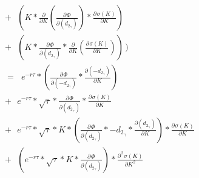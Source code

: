 \documentclass[12pt]{article}
\begin{document}
{\begin{align*}
\\
&+ \hspace{8pt}   (K * \frac{\partial}{\partial K}(\frac{\partial \hspace{1pt} \Phi}{\partial (d_{2_{\hspace{1pt} \gamma}})}) * \frac{\partial \hspace{1pt} \sigma(K)}{\partial K})
\\[12pt]
&+ \hspace{8pt}   (K * \frac{\partial \hspace{1pt} \Phi}{\partial (d_{2_{\hspace{1pt} \gamma}})} * \frac{\partial}{\partial K}(\frac{\partial \hspace{1pt} \sigma(K)}{\partial K}))\hspace{2pt})
\\[35pt]
\hspace{3pt} &= \hspace{7pt}   e^{-r \tau} * (\frac{\partial \hspace{1pt} \Phi}{\partial (-d_{2_{\hspace{1pt} \gamma}})} * \frac{\partial (-d_{2_{\hspace{1pt} \gamma}})}{\partial K})
\\[12pt]
&+ \hspace{8pt}   e^{-r \tau} * \sqrt{\tau} * \frac{\partial \hspace{1pt} \Phi}{\partial (d_{2_{\hspace{1pt} \gamma}})} * \frac{\partial \hspace{1pt} \sigma(K)}{\partial K}
\\[12pt]
&+ \hspace{8pt}   e^{-r \tau} * \sqrt{\tau} * K * (\frac{\partial \hspace{1pt} \Phi}{\partial (d_{2_{\hspace{1pt} \gamma}})} * -d_{2_{\hspace{1pt} \gamma}} * \frac{\partial (d_{2_{\hspace{1pt} \gamma}})}{\partial K}) * \frac{\partial \hspace{1pt} \sigma(K)}{\partial K}
\\[12pt]
&+ \hspace{8pt}   (e^{-r \tau} * \sqrt{\tau} * K * \frac{\partial \hspace{1pt} \Phi}{\partial (d_{2_{\hspace{1pt} \gamma}})}) * \frac{\partial^{\hspace{1pt} 2} \hspace{1pt} \sigma(K)}{\partial K^{\hspace{1pt} 2}}

\end{align*}}
\end{document}
